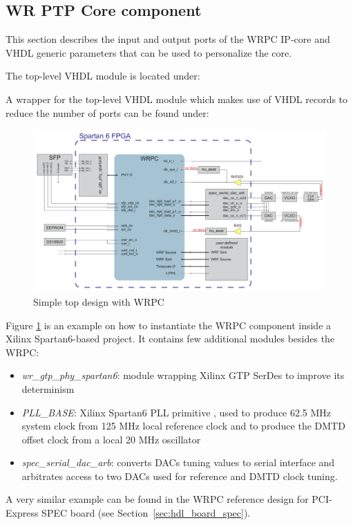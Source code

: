 \subsection{WR PTP Core component}
\label{sec:hdl_wrpc}
This section describes the input and output ports of the WRPC IP-core and VHDL generic parameters
that can be used to personalize the core.

The top-level VHDL module is located under:\\

A wrapper for the top-level VHDL module which makes use of VHDL records to reduce the number of
ports can be found under:\\

\begin{figure}
  \begin{center}
    \includegraphics[width=.9\textheight, angle=270]{fig/basic_top.pdf}
    \caption{Simple top design with WRPC}
    \label{intro:fig:wrpc_top}
  \end{center}
\end{figure}

Figure \ref{intro:fig:wrpc_top} is an example on how to instantiate the WRPC component inside a
Xilinx Spartan6-based project. It contains few additional modules besides the WRPC:
\begin{itemize}
  \item \emph{wr\_gtp\_phy\_spartan6}: module wrapping Xilinx GTP SerDes to improve its determinism
  \item \emph{PLL\_BASE}: Xilinx Spartan6 PLL primitive \cite{pll_base}, used to produce 62.5 MHz
    system clock from 125 MHz local reference clock and to produce the DMTD offset clock from a
    local 20 MHz oscillator
  \item \emph{spec\_serial\_dac\_arb}: converts DACs tuning values to serial interface and
    arbitrates access to two DACs used for reference and DMTD clock tuning.
\end{itemize}

A very similar example can be found in the WRPC reference design for PCI-Express SPEC board (see
Section~\ref{sec:hdl_board_spec}).













